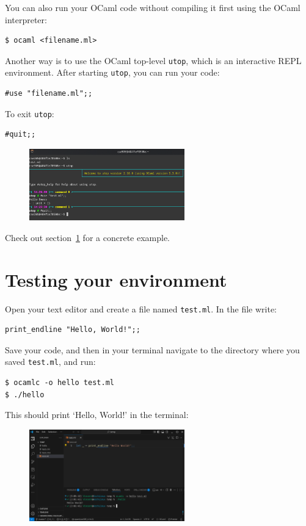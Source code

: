 \documentclass{extarticle}
\begin{document}
You can also run your OCaml code without compiling it first using the OCaml interpreter:
\begin{lstlisting}
$ ocaml <filename.ml>
\end{lstlisting}

Another way is to use the OCaml top-level \texttt{utop}, which is an interactive REPL environment.
After starting \texttt{utop}, you can run your code:
\begin{lstlisting}
#use "filename.ml";;
\end{lstlisting}
To exit \texttt{utop}:
\begin{lstlisting}
#quit;;
\end{lstlisting}
\begin{figure}[H]
  \centering
  \includegraphics[width=0.6\textwidth]{utop_run_code.png}
\end{figure}
Check out section~\ref{TestEnv} for a concrete example.


\newpage
\section{Testing your environment}\label{TestEnv}
Open your text editor and create a file named \texttt{test.ml}. In the file write:
\begin{lstlisting}
print_endline "Hello, World!";;
\end{lstlisting}

Save your code, and then in your terminal navigate to the directory where you saved \texttt{test.ml}, and run:
\begin{lstlisting}
$ ocamlc -o hello test.ml
$ ./hello
\end{lstlisting}
This should print `Hello, World!' in the terminal:
\begin{figure}[H]
  \centering
  \includegraphics[width=0.6\textwidth]{compile_success.png}
\end{figure}
\end{document}
